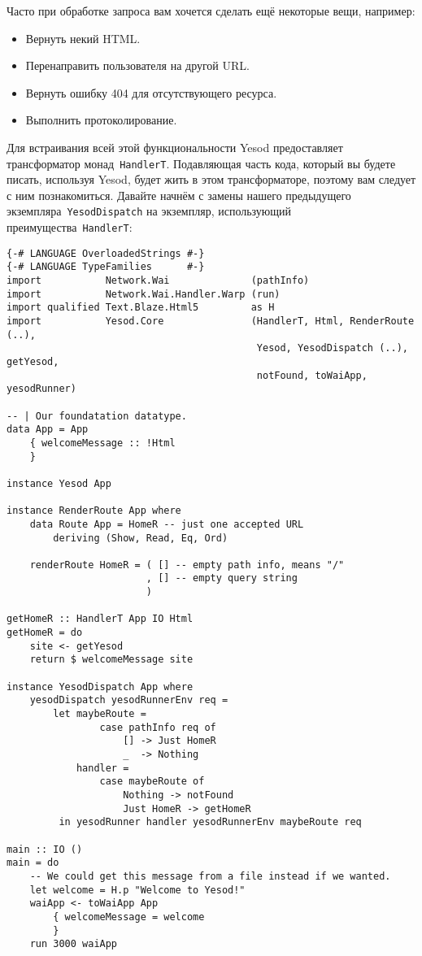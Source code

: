 Часто при обработке запроса вам хочется сделать ещё некоторые вещи, например:
\begin{itemize}
    \item Вернуть некий HTML.
    \item Перенаправить пользователя на другой URL.
    \item Вернуть ошибку 404 для отсутствующего ресурса.
    \item Выполнить протоколирование.
\end{itemize}

Для встраивания всей этой функциональности Yesod предоставляет трансформатор
монад~\lstinline'HandlerT'. Подавляющая часть кода, который вы будете писать,
используя Yesod, будет жить в этом трансформаторе, поэтому вам следует с ним
познакомиться. Давайте начнём с замены нашего предыдущего
экземпляра~\lstinline'YesodDispatch' на экземпляр, использующий
преимущества~\lstinline'HandlerT':
\begin{lstlisting}
{-# LANGUAGE OverloadedStrings #-}
{-# LANGUAGE TypeFamilies      #-}
import           Network.Wai              (pathInfo)
import           Network.Wai.Handler.Warp (run)
import qualified Text.Blaze.Html5         as H
import           Yesod.Core               (HandlerT, Html, RenderRoute (..),
                                           Yesod, YesodDispatch (..), getYesod,
                                           notFound, toWaiApp, yesodRunner)

-- | Our foundatation datatype.
data App = App
    { welcomeMessage :: !Html
    }

instance Yesod App

instance RenderRoute App where
    data Route App = HomeR -- just one accepted URL
        deriving (Show, Read, Eq, Ord)

    renderRoute HomeR = ( [] -- empty path info, means "/"
                        , [] -- empty query string
                        )

getHomeR :: HandlerT App IO Html
getHomeR = do
    site <- getYesod
    return $ welcomeMessage site

instance YesodDispatch App where
    yesodDispatch yesodRunnerEnv req =
        let maybeRoute =
                case pathInfo req of
                    [] -> Just HomeR
                    _  -> Nothing
            handler =
                case maybeRoute of
                    Nothing -> notFound
                    Just HomeR -> getHomeR
         in yesodRunner handler yesodRunnerEnv maybeRoute req

main :: IO ()
main = do
    -- We could get this message from a file instead if we wanted.
    let welcome = H.p "Welcome to Yesod!"
    waiApp <- toWaiApp App
        { welcomeMessage = welcome
        }
    run 3000 waiApp
\end{lstlisting}


